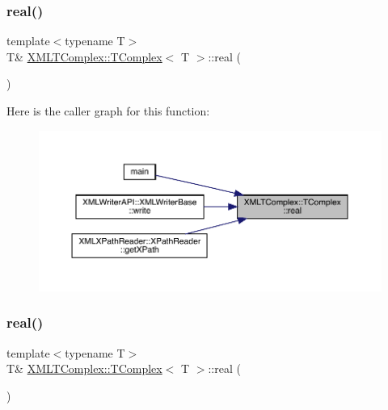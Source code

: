 \mbox{\label{classXMLTComplex_1_1TComplex_a3f7e9b8dd1c6a18da9a944d51d8118c9}} 
\subsubsection{\texorpdfstring{real()}{real()}\hspace{0.1cm}{\footnotesize\ttfamily [1/3]}}
{\footnotesize\ttfamily template$<$typename T$>$ \\
T\& \mbox{\hyperlink{classXMLTComplex_1_1TComplex}{X\+M\+L\+T\+Complex\+::\+T\+Complex}}$<$ T $>$\+::real (\begin{DoxyParamCaption}{ }\end{DoxyParamCaption})\hspace{0.3cm}{\ttfamily [inline]}}

Here is the caller graph for this function\+:
\nopagebreak
\begin{figure}[H]
\begin{center}
\leavevmode
\includegraphics[width=350pt]{db/dbe/classXMLTComplex_1_1TComplex_a3f7e9b8dd1c6a18da9a944d51d8118c9_icgraph}
\end{center}
\end{figure}
\mbox{\label{classXMLTComplex_1_1TComplex_a3f7e9b8dd1c6a18da9a944d51d8118c9}} 
\subsubsection{\texorpdfstring{real()}{real()}\hspace{0.1cm}{\footnotesize\ttfamily [2/3]}}
{\footnotesize\ttfamily template$<$typename T$>$ \\
T\& \mbox{\hyperlink{classXMLTComplex_1_1TComplex}{X\+M\+L\+T\+Complex\+::\+T\+Complex}}$<$ T $>$\+::real (\begin{DoxyParamCaption}{ }\end{DoxyParamCaption})\hspace{0.3cm}{\ttfamily [inline]}}

